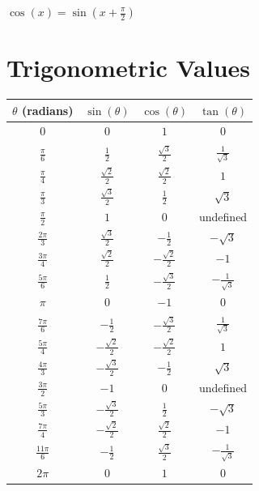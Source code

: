 \(\cos(x) = \sin(x + \frac{\pi}{2})\)

\section{Trigonometric Values}
\smallskip

\begin{center}
    \renewcommand{\arraystretch}{1.4}
    \begin{tabular}{|c|c|c|c|}
    \hline
    \(\theta\) (radians) & \(\sin(\theta)\) & \(\cos(\theta)\) & \(\tan(\theta)\) \\
    \hline
    \(0\) & \(0\) & \(1\) & \(0\) \\
    \hline
    \(\frac{\pi}{6}\) & \(\frac{1}{2}\) & \(\frac{\sqrt{3}}{2}\) & \(\frac{1}{\sqrt{3}}\) \\
    \hline
    \(\frac{\pi}{4}\) & \(\frac{\sqrt{2}}{2}\) & \(\frac{\sqrt{2}}{2}\) & \(1\) \\
    \hline
    \(\frac{\pi}{3}\) & \(\frac{\sqrt{3}}{2}\) & \(\frac{1}{2}\) & \(\sqrt{3}\) \\
    \hline
    \(\frac{\pi}{2}\) & \(1\) & \(0\) & undefined \\
    \hline
    \(\frac{2\pi}{3}\) & \(\frac{\sqrt{3}}{2}\) & \(-\frac{1}{2}\) & \(-\sqrt{3}\) \\
    \hline
    \(\frac{3\pi}{4}\) & \(\frac{\sqrt{2}}{2}\) & \(-\frac{\sqrt{2}}{2}\) & \(-1\) \\
    \hline
    \(\frac{5\pi}{6}\) & \(\frac{1}{2}\) & \(-\frac{\sqrt{3}}{2}\) & \(-\frac{1}{\sqrt{3}}\) \\
    \hline
    \(\pi\) & \(0\) & \(-1\) & \(0\) \\
    \hline
    \(\frac{7\pi}{6}\) & \(-\frac{1}{2}\) & \(-\frac{\sqrt{3}}{2}\) & \(\frac{1}{\sqrt{3}}\) \\
    \hline
    \(\frac{5\pi}{4}\) & \(-\frac{\sqrt{2}}{2}\) & \(-\frac{\sqrt{2}}{2}\) & \(1\) \\
    \hline
    \(\frac{4\pi}{3}\) & \(-\frac{\sqrt{3}}{2}\) & \(-\frac{1}{2}\) & \(\sqrt{3}\) \\
    \hline
    \(\frac{3\pi}{2}\) & \(-1\) & \(0\) & undefined \\
    \hline
    \(\frac{5\pi}{3}\) & \(-\frac{\sqrt{3}}{2}\) & \(\frac{1}{2}\) & \(-\sqrt{3}\) \\
    \hline
    \(\frac{7\pi}{4}\) & \(-\frac{\sqrt{2}}{2}\) & \(\frac{\sqrt{2}}{2}\) & \(-1\) \\
    \hline
    \(\frac{11\pi}{6}\) & \(-\frac{1}{2}\) & \(\frac{\sqrt{3}}{2}\) & \(-\frac{1}{\sqrt{3}}\) \\
    \hline
    \(2\pi\) & \(0\) & \(1\) & \(0\) \\
    \hline
    \end{tabular}
\end{center}


